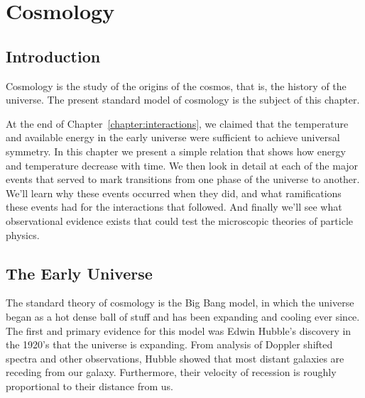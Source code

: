 

\chapter{Cosmology}
\label{chapter:cosmology}


\section{Introduction}

Cosmology is the study of the origins of the cosmos, that is, the
history of the universe.  The present standard model of cosmology is
the subject of this chapter.

At the end of Chapter~\ref{chapter:interactions}, we claimed that the
temperature and available energy in the early universe were sufficient
to achieve universal symmetry.  In this chapter we present a simple
relation that shows how energy and temperature decrease with time.  We
then look in detail at each of the major events that served to mark
transitions from one phase of the universe to another.  We'll learn
why these events occurred when they did, and what ramifications these
events had for the interactions that followed.  And finally we'll see
what observational evidence exists that could test the microscopic
theories of particle physics.

\section{The Early Universe}

The standard theory of cosmology is the Big Bang model, in which the
universe began as a hot dense ball of stuff and has been expanding and
cooling ever since.  The first and primary evidence for this model was
Edwin Hubble's discovery in the 1920's that the universe is expanding.
From analysis of Doppler shifted spectra and other observations,
Hubble showed that most distant galaxies are receding from our
galaxy. Furthermore, their velocity of recession is roughly
proportional to their distance from us.

